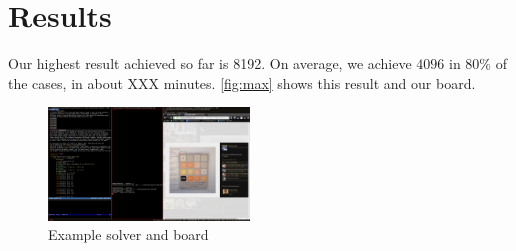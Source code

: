 \documentclass[journal]{IEEEtran}
\begin{document}
\section*{Results}
Our highest result achieved so far is 8192. On average, we achieve $4096$ in 80\%
of the cases, in about XXX minutes. \autoref{fig:max} shows this result and
our board.

\begin{figure}[Hb]
\centering
    \includegraphics[keepaspectratio, height=3cm]{fig/8192.png}
\caption{Example solver and board}
\label{fig:max}
\end{figure}





% 
\end{document}

